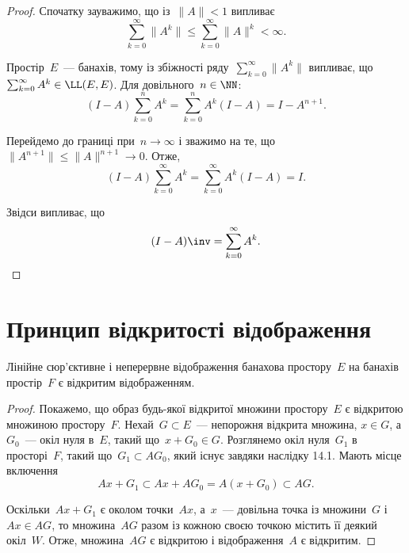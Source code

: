\begin{proof}
Спочатку зауважимо, що із~$\|A\| < 1$ випливає
\begin{equation*}
    \sum_{k = 0}^\infty \|A^k\| \le \sum_{k = 0}^\infty \|A\|^k < \infty.
\end{equation*}

Простір~$E$~--- банахів, тому із збіжності ряду~$\sum_{k = 0}^\infty \|A^k\|$
випливає, що~$\sum_{k = 0}^\infty A^k \in \LL(E, E)$. Для довільного~$n \in \NN$:
\begin{equation*}
    (I - A) \sum_{k = 0}^n A^k = \sum_{k = 0}^n A^k (I - A) = I - A^{n + 1}.
\end{equation*}

Перейдемо до границі при~$n \to \infty$ і зважимо на те, що
$\|A^{n + 1}\| \le \|A\|^{n +1} \to 0$. Отже,
\begin{equation*}
    (I - A) \sum_{k = 0}^\infty A^k = \sum_{k = 0}^\infty A^k (I - A) = I.
\end{equation*}

Звідси випливає, що
\begin{equation*}
    (I - A)\inv = \sum_{k = 0}^\infty A^k. \qedhere
\end{equation*}
\end{proof}

\section{Принцип відкритості відображення}

\begin{theorem}
Лінійне сюр’єктивне і неперервне відображення банахова
простору~$E$ на банахів простір~$F$ є відкритим
відображенням.
\end{theorem}

\begin{proof}
Покажемо, що образ будь-якої відкритої
множини простору~$E$ є відкритою множиною простору~$F$.
Нехай~$G \subset E$~--- непорожня відкрита множина, $x \in G$, а
$G_0$~--- окіл нуля в~$E$, такий що~$x + G_0 \in G$. Розглянемо
окіл нуля~$G_1$ в просторі~$F$, такий що~$G_1 \subset A G_0$, який існує
завдяки наслідку 14.1. Мають місце включення
\begin{equation*}
    A x + G_1 \subset A x + A G_0 = A (x + G_0) \subset A G.
\end{equation*}

Оскільки~$A x + G_1$ є околом точки~$A x$, а~$x$~--- довільна
точка із множини~$G$ і~$A x \in A G$, то множина~$A G$ разом із
кожною своєю точкою містить її деякий окіл~$W$. Отже,
множина~$A G$ є відкритою і відображення~$A$ є відкритим.
\end{proof}

